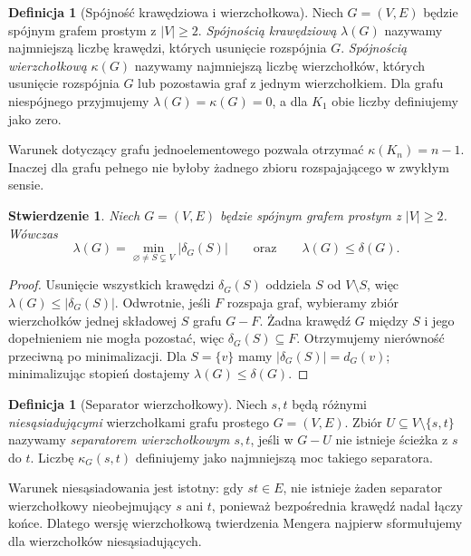\documentclass[11pt,a4paper]{report}
\numberwithin{equation}{section}
\theoremstyle{plain}
\newtheorem{stwierdzenie}[twierdzenie]{Stwierdzenie}
\theoremstyle{definition}
\newtheorem{definicja}[twierdzenie]{Definicja}
\theoremstyle{remark}
\begin{document}
\begin{definicja}[Spójność krawędziowa i wierzchołkowa]
Niech $G=(V,E)$ będzie spójnym grafem prostym z $|V|\ge2$.
\emph{Spójnością krawędziową} $\lambda(G)$ nazywamy
najmniejszą liczbę krawędzi, których usunięcie rozspójnia $G$.
\emph{Spójnością wierzchołkową} $\kappa(G)$ nazywamy
najmniejszą liczbę wierzchołków, których usunięcie
rozspójnia $G$ lub pozostawia graf z jednym wierzchołkiem.
Dla grafu niespójnego przyjmujemy $\lambda(G)=\kappa(G)=0$,
a dla $K_1$ obie liczby definiujemy jako zero.
\end{definicja}

Warunek dotyczący grafu jednoelementowego pozwala
otrzymać $\kappa(K_n)=n-1$. Inaczej dla grafu pełnego
nie byłoby żadnego zbioru rozspajającego w zwykłym sensie.

\begin{stwierdzenie}
\label{prop:tg-lambda-cut}
Niech $G=(V,E)$ będzie spójnym grafem prostym z $|V|\ge2$.
Wówczas
\[
\lambda(G)=\min_{\varnothing\ne S\subsetneq V}|\delta_G(S)|
\qquad\text{oraz}\qquad \lambda(G)\le \delta(G).
\]
\end{stwierdzenie}

\begin{proof}
Usunięcie wszystkich krawędzi $\delta_G(S)$ oddziela
$S$ od $V\setminus S$, więc
$\lambda(G)\le|\delta_G(S)|$.
Odwrotnie, jeśli $F$ rozspaja graf, wybieramy zbiór
wierzchołków jednej składowej $S$ grafu $G-F$.
Żadna krawędź $G$ między $S$ i jego dopełnieniem
nie mogła pozostać, więc $\delta_G(S)\subseteq F$.
Otrzymujemy nierówność przeciwną po minimalizacji.
Dla $S=\{v\}$ mamy $|\delta_G(S)|=d_G(v)$;
minimalizując stopień dostajemy $\lambda(G)\le\delta(G)$.
\end{proof}

\begin{definicja}[Separator wierzchołkowy]
Niech $s,t$ będą różnymi \emph{niesąsiadującymi} wierzchołkami
grafu prostego $G=(V,E)$. Zbiór $U\subseteq V\setminus\{s,t\}$
nazywamy \emph{separatorem wierzchołkowym $s,t$}, jeśli
w $G-U$ nie istnieje ścieżka z $s$ do $t$.
Liczbę $\kappa_G(s,t)$ definiujemy jako najmniejszą
moc takiego separatora.
\end{definicja}

Warunek niesąsiadowania jest istotny: gdy $st\in E$,
nie istnieje żaden separator wierzchołkowy nieobejmujący
$s$ ani $t$, ponieważ bezpośrednia krawędź nadal łączy końce.
Dlatego wersję wierzchołkową twierdzenia Mengera
najpierw sformułujemy dla wierzchołków niesąsiadujących.
\end{document}
